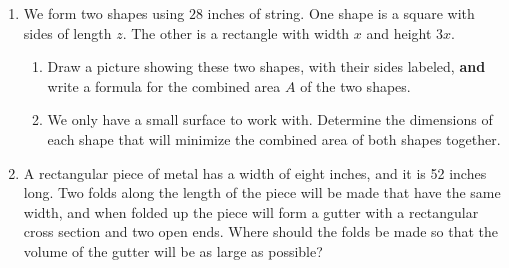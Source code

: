 \begin{enumerate}
\vfill

\clearpage

\item We form two shapes using $28$ inches of string.
One shape is a square with sides of length $z$.
The other is a rectangle with width $x$ and height $3x$.
\begin{enumerate}
\item Draw a picture showing these two shapes, with their sides
  labeled, {\bf and} write a formula for the combined area $A$ of the
  two shapes.

\vspace*{1.75in}

\item We only have a small surface to work with.  Determine the
  dimensions of each shape that will minimize the combined area of
  both shapes together.

  \vfill

\end{enumerate}

\clearpage

\item A rectangular piece of metal has a width of eight inches, and it
  is 52 inches long. Two folds along the length of the piece will be
  made that have the same width, and when folded up the piece will
  form a gutter with a rectangular cross section and two open
  ends. Where should the folds be made so that the volume of the
  gutter will be as large as possible?


    \vfill


\end{enumerate}



